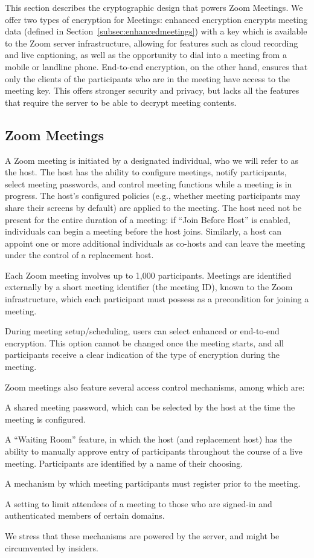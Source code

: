 This section describes the cryptographic design that powers Zoom Meetings. We offer two types of
encryption for Meetings: enhanced encryption encrypts meeting data (defined in Section~\ref{subsec:enhancedmeetings}) with a key which is
available to the Zoom server infrastructure, allowing for features such as cloud recording and live
captioning, as well as the opportunity to dial into a meeting from a mobile or landline phone.
End-to-end encryption, on the other hand, ensures that only the clients of the participants who are
in the meeting have access to the meeting key. This offers stronger security and privacy, but lacks
all the features that require the server to be able to decrypt meeting contents.

\subsection{Zoom Meetings}
\label{subsec:general-meetings}
A Zoom meeting is initiated by a designated individual, who we will refer to as the host. The host
has the ability to configure meetings, notify participants, select meeting passwords, and control
meeting functions while a meeting is in progress. The host's configured policies (e.g., whether
meeting participants may share their screens by default) are applied to the meeting. The host need
not be present for the entire duration of a meeting: if ``Join Before Host'' is enabled, individuals
can begin a meeting before the host joins. Similarly, a host can appoint one or more additional
individuals as co-hosts and can leave the meeting under the control of a replacement host.

Each Zoom meeting involves up to 1,000 participants. Meetings are identified externally by a short
meeting identifier (the meeting ID), known to the Zoom infrastructure, which each participant must
possess as a precondition for joining a meeting. 

During meeting setup/scheduling, users can select enhanced or end-to-end encryption. This option
cannot be changed once the meeting starts, and all participants receive a clear indication of the
type of encryption during the meeting. 

Zoom meetings also feature several access control mechanisms, among which are:
\begin{itemize*}
\item A shared meeting password, which can be selected by the host at the time the meeting is
configured.
\item A ``Waiting Room'' feature, in which the host (and replacement host) has the ability to
manually approve entry of participants throughout the course of a live meeting. Participants are
identified by a name of their choosing.
\item A mechanism by which meeting participants must register prior to the meeting.
\item A setting to limit attendees of a meeting to those who are signed-in and authenticated members
of certain domains.
\end{itemize*}
We stress that these mechanisms are powered by the server, and might be circumvented by insiders.

